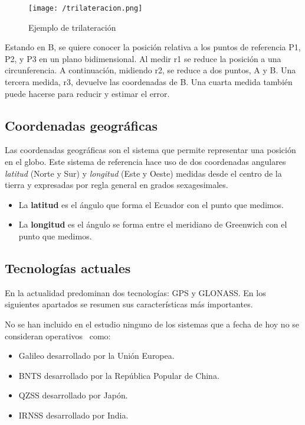 \begin{figure}[!h]
  \begin{center}
    \texttt{[image: /trilateracion.png]}
    \caption{Ejemplo de trilateración}
    \label{fig:trilateracion}
  \end{center}
\end{figure}

Estando en B, se quiere conocer la posición relativa a los puntos de referencia P1, P2, y P3 en un
plano bidimensional. Al medir r1 se reduce la posición a una circunferencia. A continuación,
midiendo r2, se reduce a dos puntos, A y B. Una tercera medida, r3, devuelve las coordenadas de
B. Una cuarta medida también puede hacerse para reducir y estimar el error.

\subsection{Coordenadas geográficas}
\label{sec:coordenadas}

Las coordenadas geográficas son el sistema que permite representar una posición en el globo. Este
sistema de referencia hace uso de dos coordenadas angulares \emph{latitud} (Norte y Sur) y
\emph{longitud} (Este y Oeste) medidas desde el centro de la tierra y expresadas por regla general
en grados sexagesimales.

\begin{itemize}
  \item La \textbf{latitud} es el ángulo que forma el Ecuador con el punto que medimos.
  \item La \textbf{longitud} es el ángulo se forma entre el meridiano de Greenwich con el punto que
    medimos.
\end{itemize}

\subsection{Tecnologías actuales}
\label{sec:tecnologiasActuales}

En la actualidad predominan dos tecnologías: \acf{GPS} y \acf{GLONASS}. En los siguientes apartados
se resumen sus características más importantes.

No se han incluido en el estudio ninguno de los sistemas que a fecha de hoy no se consideran
operativos~\cite{SPSA} como:

\begin{itemize}
  \item Galileo desarrollado por la Unión Europea.
  \item \acf{BNTS} desarrollado por la República Popular de China.
  \item \acf{QZSS} desarrollado por Japón.
  \item \acf{IRNSS} desarrollado por India.
\end{itemize}

